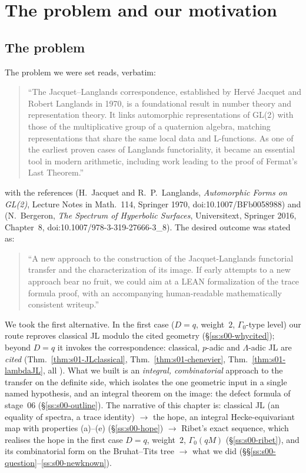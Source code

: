 \section{The problem and our motivation}\label{ss:s00-motivation}
\ifdefined\sOOsummary\sOOsummary\fi

\subsection{The problem}
The problem we were set reads, verbatim:
\begin{quote}
``The Jacquet--Langlands correspondence, established by Herv\'e Jacquet and Robert Langlands in 1970, is a foundational result
in number theory and representation theory. It links automorphic representations of GL(2) with those of the multiplicative
group of a quaternion algebra, matching representations that share the same local data and L-functions. As one of the
earliest proven cases of Langlands functoriality, it became an essential tool in modern arithmetic, including work leading to
the proof of Fermat's Last Theorem.''
\end{quote}
with the references \cite{JL} (H.~Jacquet and R.~P.~Langlands, \emph{Automorphic Forms on GL(2)}, Lecture Notes in Math.~114,
Springer 1970, doi:10.1007/BFb0058988) and \cite[Ch.~8]{Bergeron16} (N.~Bergeron, \emph{The Spectrum of Hyperbolic Surfaces},
Universitext, Springer 2016, Chapter~8, doi:10.1007/978-3-319-27666-3\_8). The desired outcome was stated as:
\begin{quote}
``A new approach to the construction of the Jacquet-Langlands functorial transfer and the characterization of its image. If
early attempts to a new approach bear no fruit, we could aim at a LEAN formalization of the trace formula proof, with an
accompanying human-readable mathematically consistent writeup.''
\end{quote}
We took the first alternative. In the first case ($D=q$, weight~$2$, $\Gamma_0$-type level) our route reproves classical JL
modulo the cited geometry (\S\ref{ss:s00-whycited}); beyond $D=q$ it invokes the correspondence: classical, $p$-adic and
$\Lambda$-adic JL are \emph{cited} (Thm.~\ref{thm:s01-JLclassical}, Thm.~\ref{thm:s01-chenevier}, Thm.~\ref{thm:s01-lambdaJL}, all
\stcited). What we built is an \emph{integral, combinatorial} approach to the transfer on the definite side, which isolates
the one geometric input in a single named hypothesis, and an integral theorem on the image: the defect formula of stage~06
(\S\ref{ss:s00-outline}). The narrative of this chapter is: classical JL (an equality of spectra, a trace identity)
$\to$ the hope, an integral Hecke-equivariant map with properties (a)--(e) (\S\ref{ss:s00-hope}) $\to$ Ribet's exact sequence, which
realises the hope in the first case $D=q$, weight~$2$, $\Gamma_0(qM)$ (\S\ref{ss:s00-ribet}), and its combinatorial form on the
Bruhat--Tits tree $\to$ what we did (\S\S\ref{ss:s00-question}--\ref{ss:s00-newknown}).


